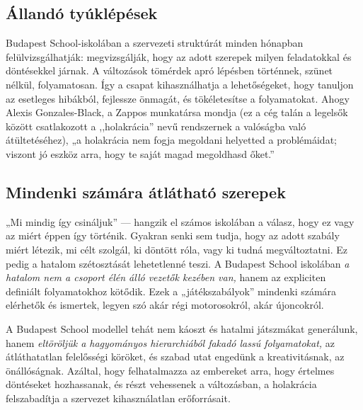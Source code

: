 \hypertarget{allando-tyuklepesek}{%
\subsection{Állandó tyúklépések}\label{allando-tyuklepesek}}

Budapest School-iskolában a szervezeti struktúrát minden hónapban
felülvizsgálhatják: megvizsgálják, hogy az adott szerepek milyen
feladatokkal és döntésekkel járnak. A változások tömérdek apró lépésben
történnek, szünet nélkül, folyamatosan. Így a csapat kihasználhatja a
lehetőségeket, hogy tanuljon az esetleges hibákból, fejlessze önmagát, és
tökéletesítse a folyamatokat. Ahogy Alexis Gonzales-Black, a Zappos
munkatársa mondja (ez a cég talán a legelsők között csatlakozott a
,,holakrácia'' nevű rendszernek a valóságba való
átültetéséhez), „a holakrácia nem fogja megoldani helyetted a
problémáidat; viszont jó eszköz arra, hogy te saját magad megoldhasd őket.''

\hypertarget{mindenki-szamara-atlathato-szerepek}{%
\subsection{Mindenki számára átlátható
szerepek}\label{mindenki-szamara-atlathato-szerepek}}

„Mi mindig így csináljuk'' --- hangzik el számos iskolában a válasz, hogy
ez vagy az miért éppen így történik. Gyakran senki sem tudja, hogy az
adott szabály miért létezik, mi célt szolgál, ki döntött róla, vagy ki
tudná megváltoztatni. Ez pedig a hatalom szétosztását lehetetlenné
teszi. A Budapest School iskolában
\emph{a hatalom nem a csoport élén álló vezetők kezében van,}
hanem az expliciten definiált folyamatokhoz kötődik. Ezek a
„játékszabályok'' mindenki számára elérhetők és ismertek, legyen szó
akár régi motorosokról, akár újoncokról.

A Budapest School modellel tehát nem káoszt és hatalmi játszmákat
generálunk, hanem
\emph{eltöröljük a hagyományos hierarchiából fakadó lassú folyamatokat,}
az átláthatatlan felelősségi köröket, és szabad utat engedünk a
kreativitásnak, az önállóságnak. Azáltal, hogy felhatalmazza az
embereket arra, hogy értelmes döntéseket hozhassanak, és részt vehessenek
a változásban, a holakrácia felszabadítja a szervezet kihasználatlan
erőforrásait.
